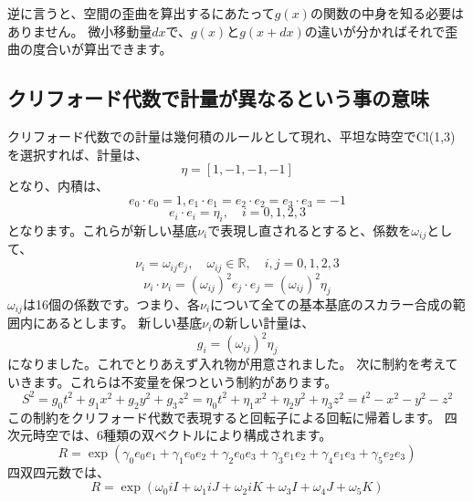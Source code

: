 \documentclass[a4paper,12pt,notitlepage]{jsreport}
\begin{document}
逆に言うと、空間の歪曲を算出するにあたって$ g(x) $の関数の中身を知る必要はありません。
微小移動量$dx$で、$ g(x) $と$ g(x + dx) $の違いが分かればそれで歪曲の度合いが算出できます。

\subsection{クリフォード代数で計量が異なるという事の意味}

クリフォード代数での計量は幾何積のルールとして現れ、平坦な時空でCl(1,3)を選択すれば、計量は、
\begin{equation}
  \eta = [1,-1,-1,-1]
\end{equation}
となり、内積は、
\begin{equation}
  e_0 \cdot e_0 = 1, e_1 \cdot e_1 = e_2 \cdot e_2 = e_3 \cdot e_3 = -1
\end{equation}
\begin{equation}
  e_i \cdot e_i = \eta_i , \quad i=0,1,2,3
\end{equation}
となります。これらが新しい基底$ \nu_i $で表現し直されるとすると、係数を$ \omega_{ij} $として、
\begin{equation}
  \nu_i = \omega_{ij} e_j , \quad \omega_{ij} \in \mathbb{R} , \quad i,j=0,1,2,3
\end{equation}
\begin{equation}
  \nu_i \cdot \nu_i = (\omega_{ij})^2 e_j \cdot e_j = (\omega_{ij})^2 \eta_j
\end{equation}
$ \omega_{ij} $は16個の係数です。つまり、各$ \nu_i $について全ての基本基底のスカラー合成の範囲内にあるとします。
新しい基底$ \nu_i $の新しい計量は、
\begin{equation} g_i = (\omega_{ij})^2 \eta_j \end{equation}
になりました。これでとりあえず入れ物が用意されました。
次に制約を考えていきます。これらは不変量を保つという制約があります。
\begin{equation}
  S^2 = g_0 t^2 + g_1 x^2 + g_2 y^2 + g_3 z^2 = \eta_0 t^2 + \eta_1 x^2 + \eta_2 y^2 + \eta_3 z^2 = t^2 - x^2 - y^2 - z^2
\end{equation}
この制約をクリフォード代数で表現すると回転子による回転に帰着します。
四次元時空では、6種類の双ベクトルにより構成されます。
\begin{equation}
  R = \exp(\gamma_0 e_0e_1 + \gamma_1 e_0e_2 + \gamma_2 e_0e_3 + \gamma_3 e_1e_2 + \gamma_4 e_1e_3 + \gamma_5 e_2e_3)
\end{equation}
四双四元数では、
\begin{equation}
  R = \exp(\omega_0 iI + \omega_1 iJ + \omega_2 iK + \omega_3 I + \omega_4 J + \omega_5 K)
\end{equation}
\end{document}

